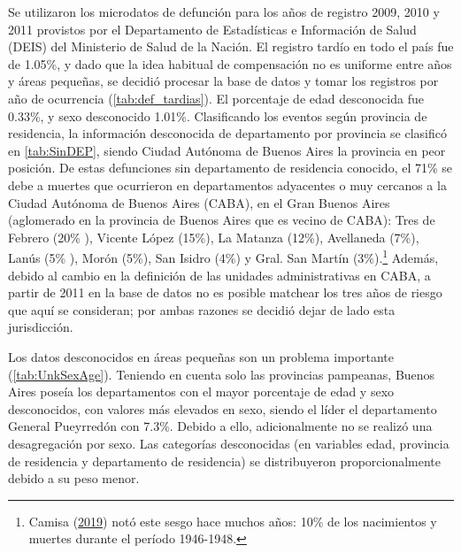 \documentclass[12pt,]{article}
\begin{document}
Se utilizaron los microdatos de defunción para los años de registro
2009, 2010 y 2011 provistos por el Departamento de Estadísticas e
Información de Salud (DEIS) del Ministerio de Salud de la Nación. El
registro tardío en todo el país fue de 1.05\%, y dado que la idea
habitual de compensación no es uniforme entre años y áreas pequeñas, se
decidió procesar la base de datos y tomar los registros por año de
ocurrencia (\ref{tab:def_tardias}). El porcentaje de edad desconocida
fue 0.33\%, y sexo desconocido 1.01\%. Clasificando los eventos según
provincia de residencia, la información desconocida de departamento por
provincia se clasificó en \ref{tab:SinDEP}, siendo Ciudad Autónoma de
Buenos Aires la provincia en peor posición. De estas defunciones sin
departamento de residencia conocido, el 71\% se debe a muertes que
ocurrieron en departamentos adyacentes o muy cercanos a la Ciudad
Autónoma de Buenos Aires (CABA), en el Gran Buenos Aires (aglomerado en
la provincia de Buenos Aires que es vecino de CABA): Tres de Febrero
(20\% ), Vicente López (15\%), La Matanza (12\%), Avellaneda (7\%),
Lanús (5\% ), Morón (5\%), San Isidro (4\%) y Gral. San Martín
(3\%).\footnote{Camisa (\protect\hyperlink{ref-Camisa_2019}{2019}) notó
  este sesgo hace muchos años: 10\% de los nacimientos y muertes durante
  el período 1946-1948.} Además, debido al cambio en la definición de
las unidades administrativas en CABA, a partir de 2011 en la base de
datos no es posible matchear los tres años de riesgo que aquí se
consideran; por ambas razones se decidió dejar de lado esta
jurisdicción.

Los datos desconocidos en áreas pequeñas son un problema importante
(\ref{tab:UnkSexAge}). Teniendo en cuenta solo las provincias pampeanas,
Buenos Aires poseía los departamentos con el mayor porcentaje de edad y
sexo desconocidos, con valores más elevados en sexo, siendo el líder el
departamento General Pueyrredón con 7.3\%. Debido a ello, adicionalmente
no se realizó una desagregación por sexo. Las categorías desconocidas
(en variables edad, provincia de residencia y departamento de
residencia) se distribuyeron proporcionalmente debido a su peso menor.
\end{document}
